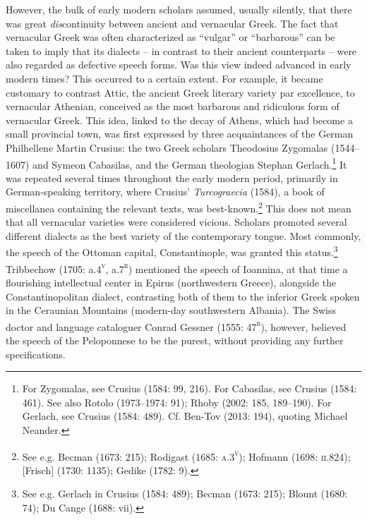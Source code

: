 \documentclass[12pt]{article}
\newenvironment{styleStandard}{\renewcommand\baselinestretch{1.25}\setlength\leftskip{0in}\setlength\rightskip{0in}\setlength\parindent{0.1972in}\setlength\parfillskip{0pt plus 1fil}\setlength\parskip{0in plus 1pt}\writerlistparindent\writerlistleftskip\leavevmode\normalfont\normalsize\writerlistlabel\ignorespaces}{\unskip\vspace{0in plus 1pt}\par}
\newcommand\writerlistleftskip{}
\newcommand\writerlistparindent{}
\newcommand\writerlistlabel{}
\begin{document}
\begin{styleStandard}
However, the bulk of early modern scholars assumed, usually silently, that there was great \textit{dis}continuity between ancient and vernacular Greek. The fact that vernacular Greek was often characterized as “vulgar” or “barbarous” can be taken to imply that its dialects – in contrast to their ancient counterparts – were also regarded as defective speech forms. Was this view indeed advanced in early modern times? This occurred to a certain extent. For example, it became customary to contrast Attic, the ancient Greek literary variety par excellence, to vernacular Athenian, conceived as the most barbarous and ridiculous form of vernacular Greek. This idea, linked to the decay of Athens, which had become a small provincial town, was first expressed by three acquaintances of the German Philhellene Martin Crusius: the two Greek scholars Theodosius Zygomalas (1544–1607) and Symeon Cabasilas, and the German theologian Stephan Gerlach.\footnote{ For Zygomalas, see Crusius (1584: 99, 216). For Cabasilas, see Crusius (1584: 461). See also Rotolo (1973–1974: 91); Rhoby (2002: 185, 189–190). For Gerlach, see Crusius (1584: 489). Cf. Ben-Tov (2013: 194), quoting Michael Neander.} It was repeated several times throughout the early modern period, primarily in German-speaking territory, where Crusius’ \textit{Turcograecia} (1584), a book of miscellanea containing the relevant texts, was best-known.\footnote{ See e.g. Becman (1673: 215); Rodigast (1685: \textsc{a.3}\textsc{\textsuperscript{v}}); Hofmann (1698: \textsc{ii}.824); [Frisch] (1730: 1135); Gedike (1782: 9).} This does not mean that all vernacular varieties were considered vicious. Scholars promoted several different dialects as the best variety of the contemporary tongue. Most commonly, the speech of the Ottoman capital, Constantinople, was granted this status.\footnote{ See e.g. Gerlach in Crusius (1584: 489); Becman (1673: 215); Blount (1680: 74); Du Cange (1688: vii).} Tribbechow (1705: a.4\textsc{\textsuperscript{v}}, a.7\textsc{\textsuperscript{r}}) mentioned the speech of Ioannina, at that time a flourishing intellectual center in Epirus (northwestern Greece), alongside the Constantinopolitan dialect, contrasting both of them to the inferior Greek spoken in the Ceraunian Mountains (modern-day southwestern Albania). The Swiss doctor and language cataloguer Conrad Gessner (1555: 47\textsc{\textsuperscript{r}}), however, believed the speech of the Peloponnese to be the purest, without providing any further specifications.
\end{styleStandard}
\end{document}
